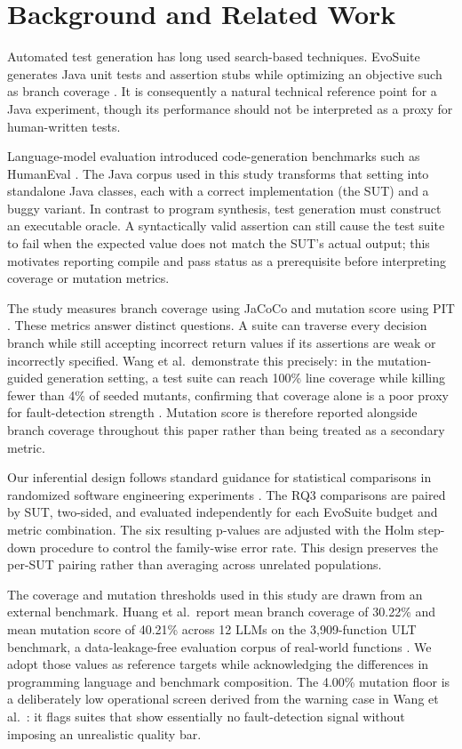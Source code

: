 ﻿\documentclass[conference]{IEEEtran}
\begin{document}
\section{Background and Related Work}
\label{sec:related}

Automated test generation has long used search-based techniques. EvoSuite generates Java unit tests and assertion stubs while optimizing an objective such as branch coverage \cite{fraser2011evosuite}. It is consequently a natural technical reference point for a Java experiment, though its performance should not be interpreted as a proxy for human-written tests.

Language-model evaluation introduced code-generation benchmarks such as HumanEval \cite{chen2021codex}. The Java corpus used in this study transforms that setting into standalone Java classes, each with a correct implementation (the SUT) and a buggy variant. In contrast to program synthesis, test generation must construct an executable oracle. A syntactically valid assertion can still cause the test suite to fail when the expected value does not match the SUT's actual output; this motivates reporting compile and pass status as a prerequisite before interpreting coverage or mutation metrics.

The study measures branch coverage using JaCoCo \cite{jacoco} and mutation score using PIT \cite{coles2016pit}. These metrics answer distinct questions. A suite can traverse every decision branch while still accepting incorrect return values if its assertions are weak or incorrectly specified. Wang et al.\ demonstrate this precisely: in the mutation-guided generation setting, a test suite can reach 100\% line coverage while killing fewer than 4\% of seeded mutants, confirming that coverage alone is a poor proxy for fault-detection strength \cite{wang2026mutgen}. Mutation score is therefore reported alongside branch coverage throughout this paper rather than being treated as a secondary metric.

Our inferential design follows standard guidance for statistical comparisons in randomized software engineering experiments \cite{arcuri2011statistics}. The RQ3 comparisons are paired by SUT, two-sided, and evaluated independently for each EvoSuite budget and metric combination. The six resulting p-values are adjusted with the Holm step-down procedure \cite{holm1979} to control the family-wise error rate. This design preserves the per-SUT pairing rather than averaging across unrelated populations.

The coverage and mutation thresholds used in this study are drawn from an external benchmark. Huang et al.\ report mean branch coverage of 30.22\% and mean mutation score of 40.21\% across 12 LLMs on the 3,909-function ULT benchmark, a data-leakage-free evaluation corpus of real-world functions \cite{huang2026ult}. We adopt those values as reference targets while acknowledging the differences in programming language and benchmark composition. The 4.00\% mutation floor is a deliberately low operational screen derived from the warning case in Wang et al.\ \cite{wang2026mutgen}: it flags suites that show essentially no fault-detection signal without imposing an unrealistic quality bar.
\end{document}
